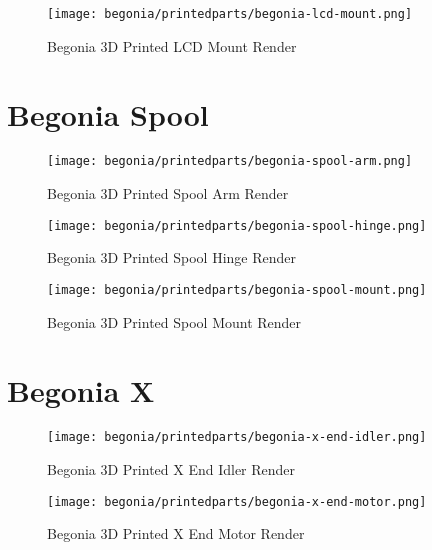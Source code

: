 \begin{figure}[H]
\centering
\texttt{[image: begonia/printedparts/begonia-lcd-mount.png]}
\caption{Begonia 3D Printed LCD Mount Render}
\label{fig:beglcdmount}
\end{figure}


\section{Begonia Spool}

\begin{figure}[H]
\centering
\texttt{[image: begonia/printedparts/begonia-spool-arm.png]}
\caption{Begonia 3D Printed Spool Arm Render}
\label{fig:begspoolarm}
\end{figure}

\begin{figure}[H]
\centering
\texttt{[image: begonia/printedparts/begonia-spool-hinge.png]}
\caption{Begonia 3D Printed Spool Hinge Render}
\label{fig:begspoolhinge}
\end{figure}

\begin{figure}[H]
\centering
\texttt{[image: begonia/printedparts/begonia-spool-mount.png]}
\caption{Begonia 3D Printed Spool Mount Render}
\label{fig:begspoolmount}
\end{figure}


\section{Begonia X}

\begin{figure}[H]
\centering
\texttt{[image: begonia/printedparts/begonia-x-end-idler.png]}
\caption{Begonia 3D Printed X End Idler Render}
\label{fig:begxendidler}
\end{figure}

\begin{figure}[H]
\centering
\texttt{[image: begonia/printedparts/begonia-x-end-motor.png]}
\caption{Begonia 3D Printed X End Motor Render}
\label{fig:begxendmotor}
\end{figure}


